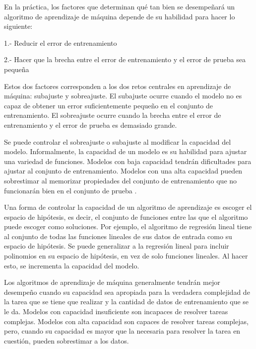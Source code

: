 \vspace{1em}

En la práctica, los factores que determinan qué tan bien se desempeñará un algoritmo de aprendizaje de máquina depende de su habilidad para hacer lo siguiente:

1.- Reducir el error de entrenamiento

2.- Hacer que la brecha entre el error de entrenamiento y el error de prueba sea pequeña

\vspace{1em}

Estos dos factores corresponden a los dos retos centrales en aprendizaje de máquina: subajuste y sobreajuste. El subajuste ocurre cuando el modelo no es capaz de obtener un error suficientemente pequeño en el conjunto de entrenamiento. El sobreajuste ocurre cuando la brecha entre el error de entrenamiento y el error de prueba es demasiado grande.

\vspace{1em}

Se puede controlar el sobreajuste o subajuste al modificar la capacidad del modelo. Informalmente, la capacidad de un modelo es su habilidad para ajustar una variedad de funciones. Modelos con baja capacidad tendrán dificultades para ajustar al conjunto de entrenamiento. Modelos con una alta capacidad pueden sobrestimar al memorizar propiedades del conjunto de entrenamiento que no funcionarán bien en el conjunto de prueba \cite{goodfellow-et-al-2016}.

\vspace{1em}

Una forma de controlar la capacidad de un algoritmo de aprendizaje es escoger el espacio de hipótesis, es decir, el conjunto de funciones entre las que el algoritmo puede escoger como soluciones. Por ejemplo, el algoritmo de regresión lineal tiene al conjunto de todas las funciones lineales de sus datos de entrada como su espacio de hipótesis. Se puede generalizar a la regresión lineal para incluir polinomios en su espacio de hipótesis, en vez de solo funciones lineales. Al hacer esto, se incrementa la capacidad del modelo.

\vspace{1em}

Los algoritmos de aprendizaje de máquina generalmente tendrán mejor desempeño cuando su capacidad sea apropiada para la verdadera complejidad de la tarea que se tiene que realizar y la cantidad de datos de entrenamiento que se le da. Modelos con capacidad insuficiente son incapaces de resolver tareas complejas. Modelos con alta capacidad son capaces de resolver tareas complejas, pero, cuando su capacidad es mayor que la necesaria para resolver la tarea en cuestión, pueden sobrestimar a los datos.


